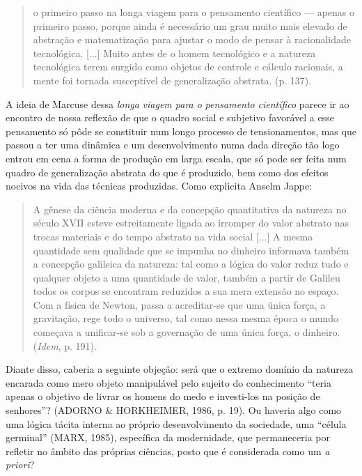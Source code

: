 \begin{quote}
o primeiro passo na longa viagem para o pensamento científico --- apenas
o primeiro passo, porque ainda é necessário um grau muito mais elevado
de abstração e matematização para ajustar o modo de pensar à
racionalidade tecnológica. {[}...{]} Muito antes de o homem tecnológico
e a natureza tecnológica terem surgido como objetos de controle e
cálculo racionais, a mente foi tornada susceptível de generalização
abstrata. (p. 137).
\end{quote}

A ideia de Marcuse dessa \emph{longa} \emph{viagem para o}
\emph{pensamento} \emph{científico} parece ir ao encontro de nossa
reflexão de que o quadro social e subjetivo favorável a esse pensamento
só pôde se constituir num longo processo de tensionamentos, mas que
passou a ter uma dinâmica e um desenvolvimento numa dada direção tão
logo entrou em cena a forma de produção em larga escala, que só pode ser
feita num quadro de generalização abstrata do que é produzido, bem como
dos efeitos nocivos na vida das técnicas produzidas. Como explicita
Anselm Jappe:

\begin{quote}
A gênese da ciência moderna e da concepção quantitativa da natureza no
século XVII esteve estreitamente ligada ao irromper do valor abstrato
nas trocas materiais e do tempo abstrato na vida social {[}...{]} A
mesma quantidade sem qualidade que se impunha no dinheiro informava
também a concepção galileica da natureza: tal como a lógica do valor
reduz tudo e qualquer objeto a uma quantidade de valor, também a partir
de Galileu todos os corpos se encontram reduzidos a sua mera extensão no
espaço. Com a física de Newton, passa a acreditar-se que uma única
força, a gravitação, rege todo o universo, tal como nessa mesma época o
mundo começava a unificar-se sob a governação de uma única força, o
dinheiro. (\emph{Idem}, p. 191).
\end{quote}

Diante disso, caberia a seguinte objeção: será que o extremo domínio da
natureza encarada como mero objeto manipulável pelo sujeito do
conhecimento ``teria apenas o objetivo de livrar os homens do medo e
investi-los na posição de senhores''? (ADORNO \& HORKHEIMER, 1986, p.
19). Ou haveria algo como uma lógica tácita interna ao próprio
desenvolvimento da sociedade, uma ``célula germinal'' (MARX, 1985),
específica da modernidade, que permaneceria por refletir no âmbito das
próprias ciências, posto que é considerada como um \emph{a priori}?

